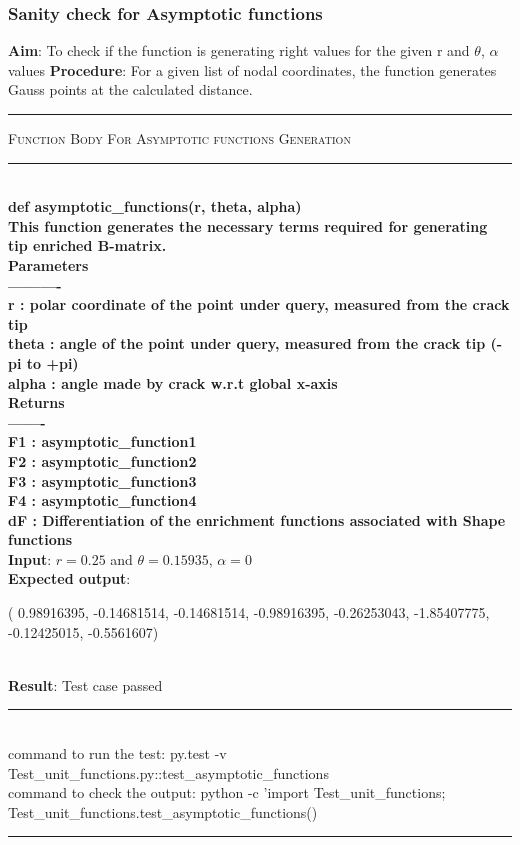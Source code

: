\documentclass[fleqn, 12.5pt,a4paper]{report}
\begin{document}
\subsubsection{Sanity check for Asymptotic functions}
\textbf{Aim}: To check if the function is generating right values for the given r and $\theta$, $\alpha$ values\newline
\textbf{Procedure}: For a given list of nodal coordinates, the function generates Gauss points at the calculated distance.
\\
{ \rule{\linewidth}{0.05cm}}
	{\scshape Function Body For Asymptotic functions Generation}\\
{ \rule{\linewidth}{0.05cm}}
{\selectfont
\\
\textbf{def asymptotic{\_}functions(r, theta, alpha)\\
    This function generates the necessary terms required for generating tip enriched \newline 
    B-matrix.\\
    Parameters\\
    ----------\\
    r : polar coordinate of the point under query, measured from the crack tip\\
    theta : angle of the point under query, measured from the crack tip (-pi to +pi)\\
    alpha : angle made by crack w.r.t global x-axis\\
    Returns\\
    -------\\
    F1 : asymptotic{\_}function1\\
    F2 : asymptotic{\_}function2\\
    F3 : asymptotic{\_}function3\\
    F4 : asymptotic{\_}function4\\
    dF : Differentiation of the enrichment functions associated with Shape functions\\
}}
\textbf{Input}: $r=0.25$ and $\theta = 0.15935$, $\alpha=0$\\ 
\textbf{Expected output}:
\begin{center}
( 0.98916395, -0.14681514, -0.14681514, -0.98916395, -0.26253043, -1.85407775,
 -0.12425015, -0.5561607)
\end{center}
\\
\textbf{Result}: Test case passed
\\
{\rule{\linewidth}{0.02cm}}\\
command to run the test: {\selectfont py.test -v Test{\_}unit{\_}functions.py::test{\_}asymptotic{\_}functions}\\
command to check the output: {\selectfont python -c 'import Test{\_}unit{\_}functions;\\
Test{\_}unit{\_}functions.test{\_}asymptotic{\_}functions()}\\
{\rule{\linewidth}{0.02cm}}
\end{document}
